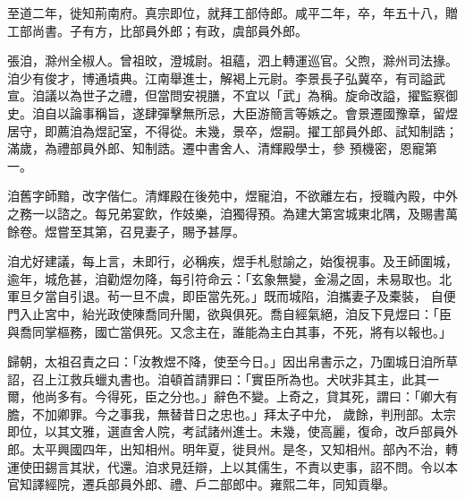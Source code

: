 \begin{pinyinscope}
 至道二年，徙知荊南府。真宗即位，就拜工部侍郎。咸平二年，卒，年五十八，贈工部尚書。子有方，比部員外郎；有政，虞部員外郎。



 張洎，滁州全椒人。曾祖旼，澄城尉。祖蘊，泗上轉運巡官。父煦，滁州司法掾。洎少有俊才，博通墳典。江南舉進士，解褐上元尉。李景長子弘冀卒，有司謚武宣。洎議以為世子之禮，但當問安視膳，不宜以「武」為稱。旋命改謚，擢監察御史。洎自以論事稱旨，遂肆彈擊無所忌，大臣游簡言等嫉之。會景遷國豫章，留煜居守，即薦洎為煜記室，不得從。未幾，景卒，煜嗣。擢工部員外郎、試知制誥；滿歲，為禮部員外郎、知制誥。遷中書舍人、清輝殿學士，參
 預機密，恩寵第一。



 洎舊字師黯，改字偕仁。清輝殿在後苑中，煜寵洎，不欲離左右，授職內殿，中外之務一以諮之。每兄弟宴飲，作妓樂，洎獨得預。為建大第宮城東北隅，及賜書萬餘卷。煜嘗至其第，召見妻子，賜予甚厚。



 洎尤好建議，每上言，未即行，必稱疾，煜手札慰諭之，始復視事。及王師圍城，逾年，城危甚，洎勸煜勿降，每引符命云：「玄象無變，金湯之固，未易取也。北軍旦夕當自引退。茍一旦不虞，即臣當先死。」既而城陷，洎攜妻子及橐裝，
 自便門入止宮中，紿光政使陳喬同升閣，欲與俱死。喬自經氣絕，洎反下見煜曰：「臣與喬同掌樞務，國亡當俱死。又念主在，誰能為主白其事，不死，將有以報也。」



 歸朝，太祖召責之曰：「汝教煜不降，使至今日。」因出帛書示之，乃圍城日洎所草詔，召上江救兵蠟丸書也。洎頓首請罪曰：「實臣所為也。犬吠非其主，此其一爾，他尚多有。今得死，臣之分也。」辭色不變。上奇之，貸其死，謂曰：「卿大有膽，不加卿罪。今之事我，無替昔日之忠也。」拜太子中允，
 歲餘，判刑部。太宗即位，以其文雅，選直舍人院，考試諸州進士。未幾，使高麗，復命，改戶部員外郎。太平興國四年，出知相州。明年夏，徙貝州。是冬，又知相州。部內不治，轉運使田錫言其狀，代還。洎求見廷辯，上以其儒生，不責以吏事，詔不問。令以本官知譯經院，遷兵部員外郎、禮、戶二部郎中。雍熙二年，同知貢舉。




\end{pinyinscope}
